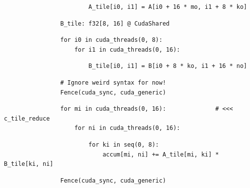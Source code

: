 \begin{minipage}[t]{0.5\textwidth}
{\begin{verbatim}
                        A_tile[i0, i1] = A[i0 + 16 * mo, i1 + 8 * ko]
\end{verbatim}
\begin{mdframed}[style=MyFrame, backgroundcolor=yellowBoxBg]
\color{yellowBoxFg}
\begin{verbatim}
                B_tile: f32[8, 16] @ CudaShared
\end{verbatim}
\end{mdframed}
\begin{mdframed}[style=MyFrame, backgroundcolor=blueBoxBg]
\color{blueBoxFg}
\begin{verbatim}
                for i0 in cuda_threads(0, 8):
                    for i1 in cuda_threads(0, 16):
\end{verbatim}
\end{mdframed}
\begin{verbatim}
                        B_tile[i0, i1] = B[i0 + 8 * ko, i1 + 16 * no]
\end{verbatim}
\begin{mdframed}[style=MyFrame, backgroundcolor=greenBoxBg]
\color{greenBoxFg}
\begin{verbatim}
                # Ignore weird syntax for now!
                Fence(cuda_sync, cuda_generic)
\end{verbatim}
\end{mdframed}
\begin{mdframed}[style=MyFrame, backgroundcolor=blueBoxBg]
\color{blueBoxFg}
\begin{verbatim}
                for mi in cuda_threads(0, 16):              # <<< c_tile_reduce
                    for ni in cuda_threads(0, 16):
\end{verbatim}
\end{mdframed}
\begin{verbatim}
                        for ki in seq(0, 8):
                            accum[mi, ni] += A_tile[mi, ki] * B_tile[ki, ni]
\end{verbatim}
\begin{mdframed}[style=MyFrame, backgroundcolor=greenBoxBg]
\color{greenBoxFg}
\begin{verbatim}
                Fence(cuda_sync, cuda_generic)
\end{verbatim}
\end{mdframed}
\begin{mdframed}[style=MyFrame, backgroundcolor=blueBoxBg]
\color{blueBoxFg}
\begin{verbatim}

\end{verbatim}
\end{mdframed}}
\end{minipage}
